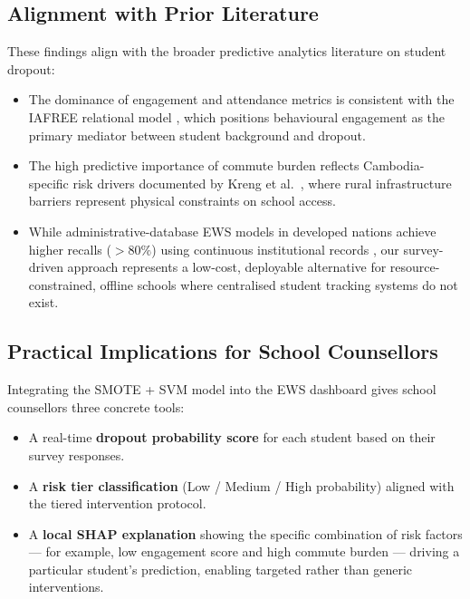 \subsection{Alignment with Prior Literature}

These findings align with the broader predictive analytics literature on student dropout:

\begin{itemize}
    \item The dominance of engagement and attendance metrics is consistent with the IAFREE relational model \cite{vasconcelos2023iafree}, which positions behavioural engagement as the primary mediator between student background and dropout.
    \item The high predictive importance of commute burden reflects Cambodia-specific risk drivers documented by Kreng et al.\ \cite{kreng2016school}, where rural infrastructure barriers represent physical constraints on school access.
    \item While administrative-database EWS models in developed nations achieve higher recalls ($>80\%$) using continuous institutional records \cite{marcolino2025catboost}, our survey-driven approach represents a low-cost, deployable alternative for resource-constrained, offline schools where centralised student tracking systems do not exist.
\end{itemize}

\subsection{Practical Implications for School Counsellors}

Integrating the SMOTE + SVM model into the EWS dashboard gives school counsellors three concrete tools:
\begin{itemize}
    \item A real-time \textbf{dropout probability score} for each student based on their survey responses.
    \item A \textbf{risk tier classification} (Low / Medium / High probability) aligned with the tiered intervention protocol.
    \item A \textbf{local SHAP explanation} showing the specific combination of risk factors --- for example, low engagement score and high commute burden --- driving a particular student's prediction, enabling targeted rather than generic interventions.
\end{itemize}
